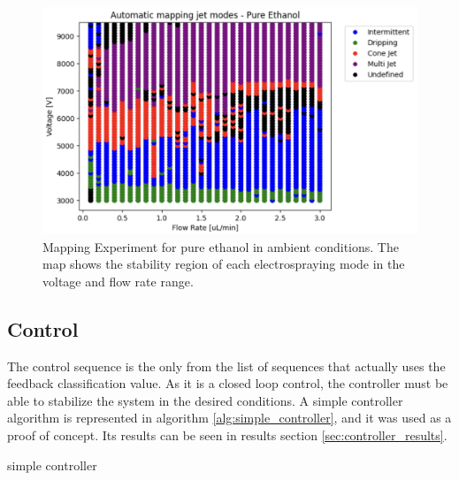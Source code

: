     \begin{figure}[H]
        \center
        \includegraphics[width=15cm]{Figuras/report4/map-2023-03-02.png}
        \caption{Mapping Experiment for pure ethanol in ambient conditions. The map shows the stability region of each electrospraying mode in the voltage and flow rate range.}
        \label{fig:map3Data_fig}
    \end{figure}



\subsection{Control}

    The control sequence is the only from the list of sequences that actually uses the feedback classification value. 
    As it is a closed loop control, the controller must be able to stabilize the system in the desired conditions.
    A simple controller algorithm is represented in algorithm \ref{alg:simple_controller}, and it was used as a proof of concept.
    Its results can be seen in results section \ref{sec:controller_results}.

    \begin{algorithm}
        \caption{simple controller}\label{alg:simple_controller}
        \begin{algorithmic}
            
                \State {}
                \State {}
            \EndIf

        \EndFunction
        \end{algorithmic}
    \end{algorithm}



